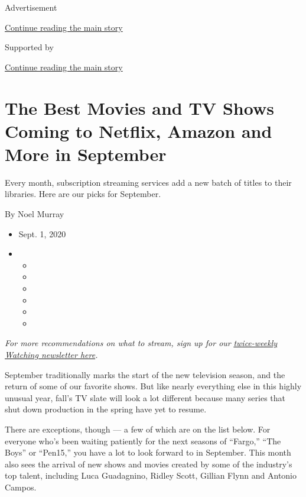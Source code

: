 Advertisement

\protect\hyperlink{after-top}{Continue reading the main story}

Supported by

\protect\hyperlink{after-sponsor}{Continue reading the main story}

\hypertarget{the-best-movies-and-tv-shows-coming-to-netflix-amazon-and-more-in-september}{%
\section{The Best Movies and TV Shows Coming to Netflix, Amazon and More
in
September}\label{the-best-movies-and-tv-shows-coming-to-netflix-amazon-and-more-in-september}}

Every month, subscription streaming services add a new batch of titles
to their libraries. Here are our picks for September.

By Noel Murray

\begin{itemize}
\item
  Sept. 1, 2020
\item
  \begin{itemize}
  \item
  \item
  \item
  \item
  \item
  \item
  \end{itemize}
\end{itemize}

\emph{For more recommendations on what to stream, sign up for our}
\href{https://www.nytimes3xbfgragh.onion/newsletters/watching}{\emph{twice-weekly
Watching newsletter here}}\emph{.}

September traditionally marks the start of the new television season,
and the return of some of our favorite shows. But like nearly everything
else in this highly unusual year, fall's TV slate will look a lot
different because many series that shut down production in the spring
have yet to resume.

There are exceptions, though --- a few of which are on the list below.
For everyone who's been waiting patiently for the next seasons of
``Fargo,'' ``The Boys'' or ``Pen15,'' you have a lot to look forward to
in September. This month also sees the arrival of new shows and movies
created by some of the industry's top talent, including Luca Guadagnino,
Ridley Scott, Gillian Flynn and Antonio Campos.

